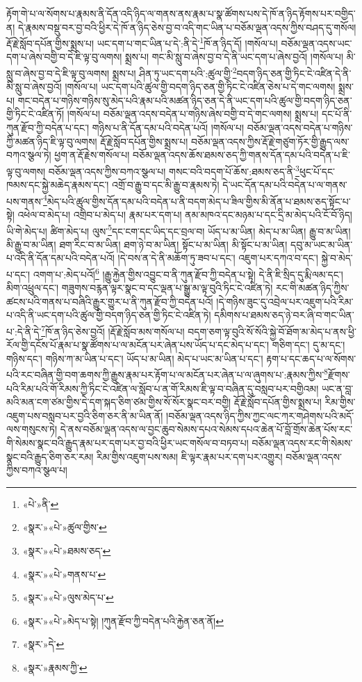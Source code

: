 རྟོག་གེ་པ་ལ་སོགས་པ་རྣམས་ནི་དོན་འདི་ཉིད་ལ་གནས་ནས་རྣམ་པ་སྣ་ཚོགས་པས་དེ་ཁོ་ན་ཉིད་རྟོགས་པར་བགྱིད་ན། དེ་རྣམས་བསྡུ་བར་བྱ་བའི་ཕྱིར་དེ་ཁོ་ན་ཉིད་ཅེས་བྱ་བ་འདི་གང་ཡིན་པ་བཅོམ་ལྡན་འདས་ཀྱིས་བཤད་དུ་གསོལ། རྡོ་རྗེ་སློབ་དཔོན་གྱིས་སྨྲས་པ། ཡང་དག་པ་གང་ཡིན་པ་དེ་:ནི་དེ་\footnote{«པེ་»ནི་}ཁོ་ན་ཉིད་དོ། །གསོལ་པ། བཅོམ་ལྡན་འདས་ཡང་དག་པ་ཞེས་བགྱི་བ་དེ་ཇི་ལྟ་བུ་ལགས། སྨྲས་པ། གང་མི་སླུ་བ་ཞེས་བྱ་བ་དེ་ནི་ཡང་དག་པ་ཞེས་བྱའོ། །གསོལ་པ། མི་སླུ་བ་ཞེས་བྱ་བ་དེ་ཇི་ལྟ་བུ་ལགས། སྨྲས་པ། ཤིན་ཏུ་ཡང་དག་པའི་:ཚུལ་གྱི་\footnote{«སྣར་»«པེ་»ཚུལ་གྱིས་}བདག་ཉིད་ཅན་གྱི་ཏིང་ངེ་འཛིན་དེ་ནི་མི་སླུ་བ་ཞེས་བྱའོ། །གསོལ་པ། ཡང་དག་པའི་ཚུལ་གྱི་བདག་ཉིད་ཅན་གྱི་ཏིང་ངེ་འཛིན་ཅེས་པ་དེ་གང་ལགས། སྨྲས་པ། གང་བདེན་པ་གཉིས་གཉིས་སུ་མེད་པའི་རྣམ་པའི་མཚན་ཉིད་ཅན་དེ་ནི་ཡང་དག་པའི་ཚུལ་གྱི་བདག་ཉིད་ཅན་གྱི་ཏིང་ངེ་འཛིན་ཏོ། །གསོལ་པ། བཅོམ་ལྡན་འདས་བདེན་པ་གཉིས་ཞེས་བགྱི་བ་དེ་གང་ལགས། སྨྲས་པ། དང་པོ་ནི་ཀུན་རྫོབ་ཀྱི་བདེན་པ་དང་། གཉིས་པ་ནི་དོན་དམ་པའི་བདེན་པའོ། །གསོལ་པ། བཅོམ་ལྡན་འདས་བདེན་པ་གཉིས་ཀྱི་མཚན་ཉིད་ཇི་ལྟ་བུ་ལགས། རྡོ་རྗེ་སློབ་དཔོན་གྱིས་སྨྲས་པ། བཅོམ་ལྡན་འདས་ཀྱིས་རྡོ་རྗེ་གཙུག་ཏོར་གྱི་རྒྱུད་ལས་བཀའ་སྩལ་ཏེ། ཕྱག་ན་རྡོ་རྗེས་གསོལ་པ། བཅོམ་ལྡན་འདས་ཆོས་ཐམས་ཅད་ཀྱི་གནས་དོན་དམ་པའི་བདེན་པ་ཇི་ལྟ་བུ་ལགས། བཅོམ་ལྡན་འདས་ཀྱིས་བཀའ་སྩལ་པ། གསང་བའི་བདག་པོ་ཆོས་:ཐམས་ཅད་ནི་\footnote{«སྣར་»«པེ་»ཐམས་ཅད་}ཕུང་པོ་དང་ཁམས་དང་སྐྱེ་མཆེད་རྣམས་དང་། འགྲོ་བ་རྒྱུ་བ་དང་མི་རྒྱུ་བ་རྣམས་ཏེ། དེ་ཡང་དོན་དམ་པའི་བདེན་པ་ལ་གནས་པས་གནས་\footnote{«སྣར་»«པེ་»གནས་པ་}མེད་པའི་ཚུལ་གྱིས་དོན་དམ་པའི་བདེན་པ་ནི་བདག་མེད་པ་ཟིལ་གྱིས་མི་ནོན་པ་ཐམས་ཅད་སྟོང་པ་སྟེ། འཕེལ་བ་མེད་པ། འགྲིབ་པ་མེད་པ། རྣམ་པར་དག་པ། ནམ་མཁའ་དང་མཉམ་པ་དང་དྲི་མ་མེད་པའི་ངོ་བོ་ཉིད། ཡི་གེ་མེད་པ། ཚིག་མེད་པ། ལུས་\footnote{«སྣར་»«པེ་»ལུས་མེད་པ་}དང་ངག་དང་ཡིད་དང་བྲལ་བ། ཡོད་པ་མ་ཡིན། མེད་པ་མ་ཡིན། རྒྱུ་བ་མ་ཡིན། མི་རྒྱུ་བ་མ་ཡིན། ཐག་རིང་བ་མ་ཡིན། ཐག་ཉེ་བ་མ་ཡིན། སྟོང་པ་མ་ཡིན། མི་སྟོང་པ་མ་ཡིན། དབུ་མ་ཡང་མ་ཡིན་པ་འདི་ནི་དོན་དམ་པའི་བདེན་པའོ། །དེ་བས་ན་དེ་ནི་མཆོག་ཏུ་ཟབ་པ་དང་། འཇུག་པར་དཀའ་བ་དང་། སྐྱེ་བ་མེད་པ་དང་། འགག་པ་:མེད་པའོ།\footnote{«སྣར་»«པེ་»མེད་པ་སྟེ། །ཀུན་རྫོབ་ཀྱི་བདེན་པའི་རྐྱེན་ཅན་ནོ།} །རྒྱུ་རྐྱེན་གྱིས་འབྱུང་བ་ནི་ཀུན་རྫོབ་ཀྱི་བདེན་པ་སྟེ། དེ་ནི་ཇི་སྲིད་དུ་རྨི་ལམ་དང་། མིག་འཕྲུལ་དང་། གཟུགས་བརྙན་ལྟར་སྣང་བ་དང་ལྡན་པ་སྒྱུ་མ་ལྟ་བུའི་ཏིང་ངེ་འཛིན་ཏེ། རང་གི་མཚན་ཉིད་ཀྱིས་ཚངས་པའི་གནས་པ་བཞིའི་རྒྱུར་གྱུར་པ་ནི་ཀུན་རྫོབ་ཀྱི་བདེན་པའོ། །དེ་གཉིས་ཟུང་དུ་འབྲེལ་པར་འཇུག་པའི་རིམ་པ་འདི་ནི་ཡང་དག་པའི་ཚུལ་གྱི་བདག་ཉིད་ཅན་གྱི་ཏིང་ངེ་འཛིན་ཏེ། དམིགས་པ་ཐམས་ཅད་ཉེ་བར་ཞི་བ་གང་ཡིན་པ་:དེ་ནི་དེ་\footnote{«སྣར་»དེ་}ཁོ་ན་ཉིད་ཅེས་བྱའོ། །རྡོ་རྗེ་སློབ་མས་གསོལ་པ། བདག་ཅག་ལྟ་བུའི་སོ་སོའི་སྐྱེ་བོ་ཐོག་མ་མེད་པ་ནས་ཕྱི་རོལ་གྱི་དངོས་པོ་རྣམ་པ་སྣ་ཚོགས་པ་ལ་མངོན་པར་ཞེན་པས་ཡོད་པ་དང་མེད་པ་དང་། གཅིག་དང་། དུ་མ་དང་། གཉིས་དང་། གཉིས་ཀ་མ་ཡིན་པ་དང་། ཡོད་པ་མ་ཡིན། མེད་པ་ཡང་མ་ཡིན་པ་དང་། རྟག་པ་དང་ཆད་པ་ལ་སོགས་པའི་རང་བཞིན་གྱི་བག་ཆགས་ཀྱི་རྒྱུས་རྣམ་པར་རྟོག་པ་ལ་མངོན་པར་ཞེན་པ་ལ་ཞུགས་པ་:རྣམས་ཀྱིས་\footnote{«སྣར་»རྣམས་ཀྱི་}རྫོགས་པའི་རིམ་པའི་གོ་རིམས་ཀྱི་ཏིང་ངེ་འཛིན་ལ་སློབ་པ་ན་གོ་རིམས་ཇི་ལྟ་བ་བཞིན་དུ་བསླབ་པར་བགྱིའམ། ཡང་ན་བླ་མའི་མན་ངག་ཙམ་གྱིས་དེ་དག་སྐད་ཅིག་ཙམ་གྱིས་སོ་སོར་སྣང་བར་བགྱི། རྡོ་རྗེ་སློབ་དཔོན་གྱིས་སྨྲས་པ། རིམ་གྱིས་འཇུག་པས་བསླབ་པར་བྱའི་ཅིག་ཅར་ནི་མ་ཡིན་ནོ། །བཅོམ་ལྡན་འདས་ཉིད་ཀྱིས་ཀྱང་ལང་ཀར་གཤེགས་པའི་མདོ་ལས་གསུངས་ཏེ། དེ་ནས་བཅོམ་ལྡན་འདས་ལ་བྱང་ཆུབ་སེམས་དཔའ་སེམས་དཔའ་ཆེན་པོ་བློ་གྲོས་ཆེན་པོས་རང་གི་སེམས་སྣང་བའི་རྒྱུད་རྣམ་པར་དག་པར་བྱ་བའི་ཕྱིར་ཡང་གསོལ་བ་བཏབ་པ། བཅོམ་ལྡན་འདས་རང་གི་སེམས་སྣང་བའི་རྒྱུད་ཅིག་ཅར་རམ། རིམ་གྱིས་འཇུག་པས་སམ། ཇི་ལྟར་རྣམ་པར་དག་པར་འགྱུར། བཅོམ་ལྡན་འདས་ཀྱིས་བཀའ་སྩལ་པ། 